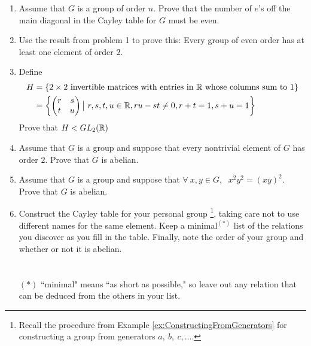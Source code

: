 \begin{enumerate}
    \item Assume that $G$ is a group of order $n$. Prove that the number of $e$'s off the main diagonal in the Cayley table for $G$ must be even. \\ \steezybreak
    
    \item Use the result from problem 1 to prove this: Every group of even order has at least one element of order $2$. \\ \steezybreak
    
    \item Define
    \begin{align}
        H&= \{2\times 2 \text{ invertible matrices with entries in }{\mathbb{R}}\text{ whose columns sum to }1\} \nonumber \\
        &= \left \{\begin{pmatrix}
            r&s\\t&u
        \end{pmatrix}\big | \ r,s,t,u \in {\mathbb{R}}, ru-st\neq 0, r+t=1, s+u=1 \right \} \nonumber
    \end{align}
    Prove that $H<GL_2({\mathbb{R}})$ \\ \steezybreak

    \item Assume that $G$ is a group and suppose that every nontrivial element of $G$ has order $2$. Prove that $G$ is abelian. \\ \steezybreak
    
    \item Assume that $G$ is a group and suppose that $\forall \ x,y \in G$, $\ \ x^2y^2=(xy)^2$. Prove that $G$ is abelian. \\ \steezybreak
    
    \item Construct the Cayley table for your personal group \footnote{Recall the procedure from Example \ref{ex:ConstructingFromGenerators} for constructing a group from generators $a,\ b,\ c,\ldots$.}, taking care not to use different names for the same element. Keep a minimal$^{(*)}$ list of the relations you discover as you fill in the table. Finally, note the order of your group and whether or not it is abelian. \\ \\ \\ $(*)$ ``minimal" means ``as short as possible," so leave out any relation that can be deduced from the others in your list.
\end{enumerate}
\newpage
